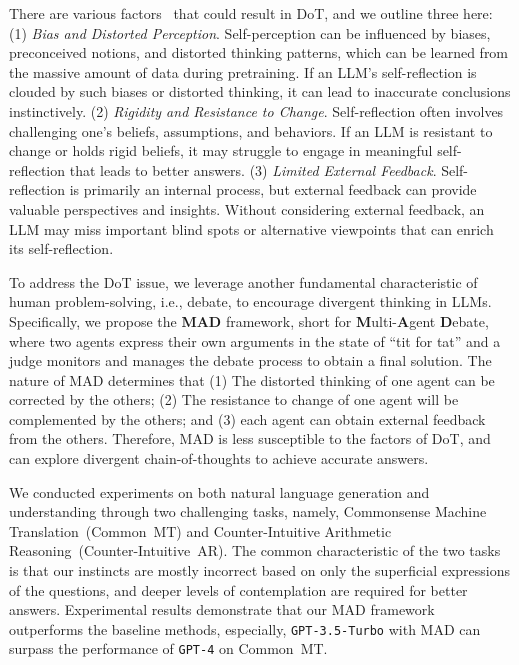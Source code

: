 There are various factors~\citep{bortolotti2011does,keestra2017metacognition} that could result in DoT, and we outline three here:
(1) \textit{Bias and Distorted Perception}. Self-perception can be influenced by biases, preconceived notions, and distorted thinking patterns, which can be learned from the massive amount of data during pretraining. If an LLM's self-reflection is clouded by such biases or distorted thinking, it can lead to inaccurate conclusions instinctively.
(2) \textit{Rigidity and Resistance to Change}. Self-reflection often involves challenging one's beliefs, assumptions, and behaviors. If an LLM is resistant to change or holds rigid beliefs, it may struggle to engage in meaningful self-reflection that leads to better answers.
(3) \textit{Limited External Feedback}. Self-reflection is primarily an internal process, but external feedback can provide valuable perspectives and insights. Without considering external feedback, an LLM may miss important blind spots or alternative viewpoints that can enrich its self-reflection.

To address the DoT issue, we leverage another fundamental characteristic of human problem-solving, i.e., debate, to encourage divergent thinking in LLMs.
Specifically, we propose the \textbf{MAD} framework, short for \textbf{M}ulti-\textbf{A}gent \textbf{D}ebate, where two agents express their own arguments in the state of ``tit for tat'' and a judge monitors and manages the debate process to obtain a final solution.
The nature of MAD determines that (1) The distorted thinking of one agent can be corrected by the others; (2) The resistance to change of one agent will be complemented by the others; and (3) each agent can obtain external feedback from the others. 
Therefore, MAD is less susceptible to the factors of DoT, and can explore divergent chain-of-thoughts to achieve accurate answers.

We conducted experiments on both natural language generation and understanding through two challenging tasks, namely, Commonsense Machine Translation~(Common~MT) and Counter-Intuitive Arithmetic Reasoning~(Counter-Intuitive~AR).
The common characteristic of the two tasks is that our instincts are mostly incorrect based on only the superficial expressions of the questions, and deeper levels of contemplation are required for better answers.
Experimental results demonstrate that our MAD framework outperforms the baseline methods, especially, \texttt{GPT-3.5-Turbo} with MAD can surpass the performance of \texttt{GPT-4} on Common~MT. 

